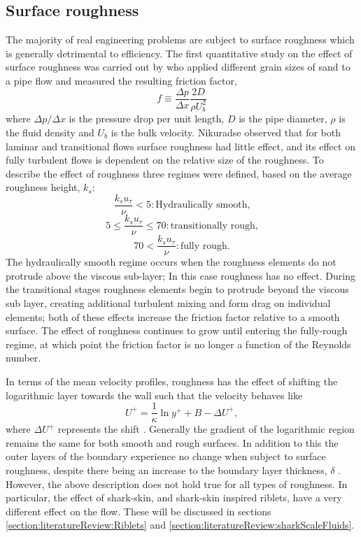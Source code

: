 \documentclass[12pt,oneside,a4paper]{article}
\begin{document}
\subsection{Surface roughness}
The majority of real engineering problems are subject to surface roughness which is generally detrimental to efficiency. The first quantitative study on the effect of surface roughness was carried out by \cite{nikuradse1933} who applied different grain sizes of sand to a pipe flow and measured the resulting friction factor,
%
\begin{equation}
f \equiv \frac{\Delta p}{\Delta x} \frac{2D}{\rho U_b^2}
\end{equation}
%
where $\Delta p / \Delta x$ is the pressure drop per unit length, $D$ is the pipe diameter, $\rho$ is the fluid density and $U_b$ is the bulk velocity. Nikuradse observed that for both laminar and transitional flows surface roughness had little effect, and its effect on fully turbulent flows is dependent on the relative size of the roughness. To describe the effect of roughness three regimes were defined, based on the average roughness height, $k_s$:
%
$$\frac{k_s u_\tau}{\nu} < 5: \text{Hydraulically smooth,} $$
$$5 \leq \frac{k_s u_\tau}{\nu} \leq 70:	\text{transitionally rough,} $$
$$70 < \frac{k_s u_\tau}{\nu}:	\text{fully rough.}		$$
%
The hydraulically smooth regime occurs when the roughness elements do not protrude above the viscous sub-layer; In this case roughness has no effect. During the transitional stages roughness elements begin to protrude beyond the viscous sub layer, creating additional turbulent mixing and form drag on individual elements; both of these effects increase the friction factor relative to a smooth surface. The effect of roughness continues to grow until entering the fully-rough regime, at which point the friction factor is no longer a function of the Reynolds number.

In terms of the mean velocity profiles, roughness has the effect of shifting the logarithmic layer towards the wall such that the velocity behaves like
\begin{equation}
U^+ = \frac{1}{\kappa} \ln{y^+} + B - \Delta U^+,
\end{equation}
where $\Delta U^+$ represents the shift \citep{newhall2006}. Generally the gradient of the logarithmic region remains the same for both smooth and rough surfaces. In addition to this the outer layers of the boundary experience no change when subject to surface roughness, despite there being an increase to the boundary layer thickness, $\delta$ \citep{perlin2016}. However, the above description does not hold true for all types of roughness. In particular, the effect of shark-skin, and shark-skin inspired riblets, have a very different effect on the flow. These will be discussed in sections \ref{section:literatureReview:Riblets} and \ref{section:literatureReview:sharkScaleFluids}.
\end{document}
